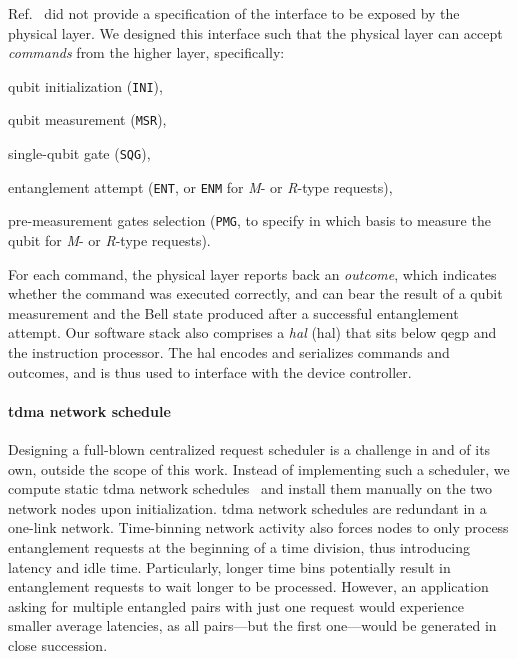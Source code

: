 Ref.~\cite{dahlberg_2019_egp} did not provide a specification of the interface to be exposed by the
physical layer. We designed this interface such that the physical layer can accept \emph{commands}
from the higher layer, specifically:
%
\begin{inlinelist}
    \item qubit initialization (\texttt{INI}),
    \item qubit measurement (\texttt{MSR}),
    \item single-qubit gate (\texttt{SQG}),
    \item entanglement attempt (\texttt{ENT}, or \texttt{ENM} for \emph{M}- or \emph{R}-type
          requests),
    \item pre-measurement gates selection (\texttt{PMG}, to specify in which basis to measure the
          qubit for \emph{M}- or \emph{R}-type requests).
\end{inlinelist}
For each command, the physical layer reports back an \emph{outcome}, which indicates whether the
command was executed correctly, and can bear the result of a qubit measurement and the Bell state
produced after a successful entanglement attempt. Our software stack also comprises a
\emph{\acrlong{hal}} (\acrshort{hal}) that sits below \acrshort{qegp} and the instruction processor.
The \acrshort{hal} encodes and serializes commands and outcomes, and is thus used to interface with
the device controller.

\paragraph{\acrshort{tdma} network schedule}

Designing a full-blown centralized request scheduler is a challenge in and of its own, outside the
scope of this work. Instead of implementing such a scheduler, we compute static \acrshort{tdma}
network schedules~\cite{skrzypczyk_2021_arch} and install them manually on the two network nodes
upon initialization. \acrshort{tdma} network schedules are redundant in a one-link network.
Time-binning network activity also forces nodes to only process entanglement requests at the
beginning of a time division, thus introducing latency and idle time. Particularly, longer time bins
potentially result in entanglement requests to wait longer to be processed. However, an application
asking for multiple entangled pairs with just one request would experience smaller average
latencies, as all pairs—but the first one—would be generated in close succession.

